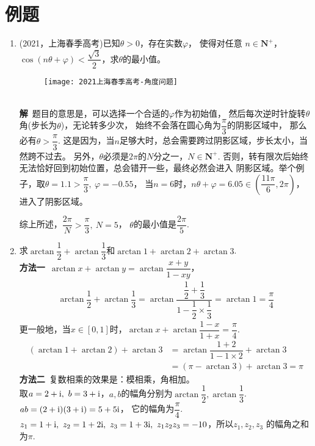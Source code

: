 \section{例题}
\begin{enumerate}[label={【\textbf{例\thechapter.\arabic*}】},
 leftmargin=\inteval{\myenumleftmargin}pt,
 itemsep=\inteval{\myenumitempsep}pt,
 itemindent=\inteval{\myenumitemindent}pt]
\item (2021，上海春季高考)已知$ \theta>0 $，存在实数$ \varphi $，
使得对任意 $ n\in \mathbf{N}^{+} $，$ \cos(n\theta+\varphi)
<\dfrac{\sqrt{3}}{2} $，求$ \theta $的最小值。
\begin{figure}[!ht]
    \centering
    \texttt{[image: 2021上海春季高考-角度问题]}
\end{figure} \\
\textbf{解}\ 题目的意思是，可以选择一个合适的$ \varphi $作为初始值，
然后每次逆时针旋转$ \theta $角(步长为$ \theta $)，无论转多少次，
始终不会落在圆心角为$ \dfrac{\pi}{3} $的阴影区域中，
那么必有$ \theta>\dfrac{\pi}{3} $. 
这是因为，当$ n $足够大时，总会需要跨过阴影区域，步长太小，当然跨不过去。
另外，$ \theta $必须是$ 2\pi $的$ N $分之一，$ N\in \textbf{N}^+ $.
否则，转有限次后始终无法恰好回到初始位置，总会错开一些，最终必然会进入
阴影区域。举个例子，取$ \theta=1.1>\dfrac{\pi}{3},\ \varphi=-0.55 $，
当$ n=6 $时，$ n\theta+\varphi=6.05\in\left(\dfrac{11\pi}{6},
2\pi\right) $，进入了阴影区域。

综上所述，$ \dfrac{2\pi}{N}>\dfrac{\pi}{3},\ N=5 $，
$ \theta $的最小值是$ \dfrac{2\pi}{5} $. 

\item 求$ \arctan \dfrac{1}{2}+\arctan \dfrac{1}{3} $和$ \arctan 1+
\arctan 2+\arctan 3 $. \\
\textbf{方法一}\ $ \arctan x+\arctan y=\arctan\dfrac{x+y}{1-xy} $，
\begin{gather*}
    \arctan \dfrac{1}{2}+ \arctan\dfrac{1}{3}=\arctan\dfrac{\dfrac{1}{2}
        +\dfrac{1}{3}}{1-\dfrac{1}{2}\times \dfrac{1}{3}}=\arctan 1=\dfrac{\pi}{4}
\end{gather*}
更一般地，当$ x\in [0,1] $时，$ \arctan x+\arctan \dfrac{1-x}{1+x}=\dfrac{\pi}{4} $. 
\begin{align*}
    (\arctan 1+\arctan 2)+\arctan 3 &=\arctan\dfrac{1+2}{1-1\times 2}
    +\arctan3 \\ &= (\pi-\arctan 3)+\arctan 3=\pi
\end{align*}
\textbf{方法二}\ 复数相乘的效果是：模相乘，角相加。\\
取$ a=2+\i,\ b=3+\i $，$ a,b $的幅角分别为$ \arctan 
\dfrac{1}{2},\arctan \dfrac{1}{3} $. \\ $ ab=(2+\mathrm{i})(3+\mathrm{i})=5+5\mathrm{i} $，
它的幅角为$ \dfrac{\pi}{4} $. \\
$ z_1=1+\i,\ z_2=1+2\i,\ z_3=1+3\i,\ z_1z_2z_3=-10 $，所以$ z_1,z_2,z_3 $
的幅角之和为$ \pi $. 


\end{enumerate}
